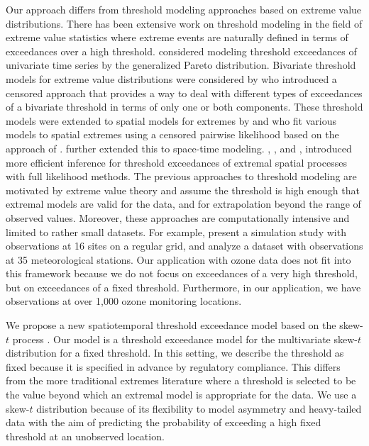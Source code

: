 \documentclass[11pt]{article}
\begin{document}
Our approach differs from threshold modeling approaches based on extreme value distributions.
There has been extensive work on threshold modeling in the field of extreme value statistics where extreme events are naturally defined in terms of exceedances over a high threshold.
\citet{Davison1990} considered modeling threshold exceedances of univariate time series by the generalized Pareto distribution.
Bivariate threshold models for extreme value distributions were considered by \citet{Ledford1996} who introduced a censored approach that provides a way to deal with different types of exceedances of a bivariate threshold in terms of only one or both components.
These threshold models were extended to spatial models for extremes by \citet{Wadsworth2012} and \citet{Thibaud2013} who fit various models to spatial extremes using a censored pairwise likelihood \citep{Padoan2010} based on the approach of \citet{Ledford1996}.
\citet{Huser2014} further extended this to space-time modeling.
\citet{Thibaud2013a}, \citet{Engelke2014}, and \citet{Wadsworth2014}, introduced more efficient inference for threshold exceedances of extremal spatial processes with full likelihood methods.
The previous approaches to threshold modeling are motivated by extreme value theory and assume the threshold is high enough that extremal models are valid for the data, and for extrapolation beyond the range of observed values.
Moreover, these approaches are computationally intensive and limited to rather small datasets.
For example, \citet{Wadsworth2014} present a simulation study with observations at 16 sites on a regular grid, and \citet{Engelke2014} analyze a dataset with observations at 35 meteorological stations.
Our application with ozone data does not fit into this framework because we do not focus on exceedances of a very high threshold, but on exceedances of a fixed threshold.
Furthermore, in our application, we have observations at over 1,000 ozone monitoring locations.

We propose a new spatiotemporal threshold exceedance model based on the skew-$t$ process \citep{Padoan2011}.
Our model is a threshold exceedance model for the multivariate skew-$t$ distribution for a fixed threshold.
In this setting, we describe the threshold as fixed because it is specified in advance by regulatory compliance.
This differs from the more traditional extremes literature where a threshold is selected to be the value beyond which an extremal model is appropriate for the data.
We use a skew-$t$ distribution because of its flexibility to model asymmetry and heavy-tailed data with the aim of predicting the probability of exceeding a high fixed threshold at an unobserved location.
\end{document}
